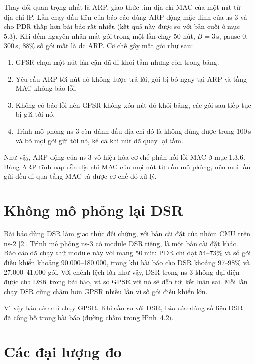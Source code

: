 \documentclass[a4paper,13pt]{extreport}
\begin{document}
Thay đổi quan trọng nhất là ARP, giao thức tìm địa chỉ MAC của một nút từ địa chỉ IP. Lần chạy đầu tiên của báo cáo dùng ARP động mặc định của ns-3 và cho PDR thấp hơn bài báo rất nhiều (kết quả này được so với bản cuối ở mục 5.3). Khi đếm nguyên nhân mất gói trong một lần chạy 50 nút, $B = 3$\,s, pause 0, 300\,s, 88\% số gói mất là do ARP. Cơ chế gây mất gói như sau:
\begin{enumerate}[leftmargin=1.6cm]
  \item GPSR chọn một nút lân cận đã đi khỏi tầm nhưng còn trong bảng.
  \item Yêu cầu ARP tới nút đó không được trả lời, gói bị bỏ ngay tại ARP và tầng MAC không báo lỗi.
  \item Không có báo lỗi nên GPSR không xóa nút đó khỏi bảng, các gói sau tiếp tục bị gửi tới nó.
  \item Trình mô phỏng ns-3 còn đánh dấu địa chỉ đó là không dùng được trong 100\,s và bỏ mọi gói gửi tới nó, kể cả khi nút đã quay lại tầm.
\end{enumerate}
Như vậy, ARP động của ns-3 vô hiệu hóa cơ chế phản hồi lỗi MAC ở mục 1.3.6. Bảng ARP tĩnh nạp sẵn địa chỉ MAC của mọi nút từ đầu mô phỏng, nên mọi lần gửi đều đi qua tầng MAC và được cơ chế đó xử lý.

\section{Không mô phỏng lại DSR}

Bài báo dùng DSR làm giao thức đối chứng, với bản cài đặt của nhóm CMU trên ns-2 [2]. Trình mô phỏng ns-3 có module DSR riêng, là một bản cài đặt khác. Báo cáo đã chạy thử module này với mạng 50 nút: PDR chỉ đạt 54--73\% và số gói điều khiển khoảng 90.000--180.000, trong khi bài báo cho DSR khoảng 97--98\% và 27.000--41.000 gói. Với chênh lệch lớn như vậy, DSR trong ns-3 không đại diện được cho DSR trong bài báo, và so GPSR với nó sẽ dẫn tới kết luận sai. Mỗi lần chạy DSR cũng chậm hơn GPSR nhiều lần vì số gói điều khiển lớn.

Vì vậy báo cáo chỉ chạy GPSR. Khi cần so với DSR, báo cáo dùng số liệu DSR đã công bố trong bài báo (đường chấm trong Hình~4.2).

\section{Các đại lượng đo}
\end{document}
